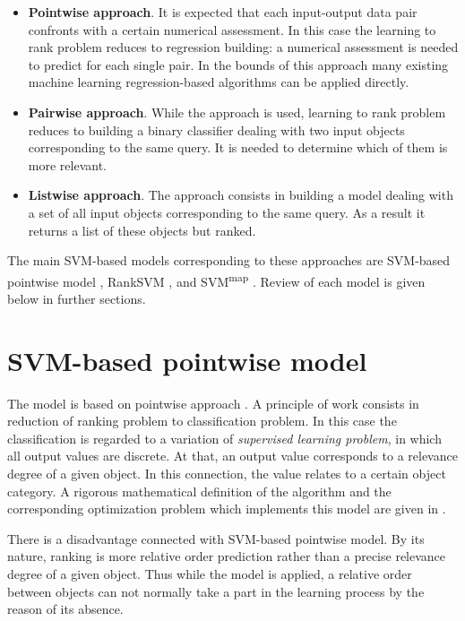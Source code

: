 \documentclass[12pt,a4paper,oneside]{article}
\begin{document}
\begin{itemize}
	\item \textbf{Pointwise approach}. It is expected that each input-output data pair confronts with a certain numerical assessment. 
	In this case the learning to rank problem reduces to regression building: a numerical assessment is needed to predict for each single pair. 
	In the bounds of this approach many existing machine learning regression-based algorithms can be applied directly.
	\item \textbf{Pairwise approach}. While the approach is used, learning to rank problem reduces to building a binary classifier dealing with two input objects corresponding to the same query. 
	It is needed to determine which of them is more relevant.
	\item \textbf{Listwise approach}. The approach consists in building a model dealing with a set of all input objects corresponding to the same query. 
	As a result it returns a list of these objects but ranked.
\end{itemize}

\par
The main SVM-based models corresponding to these approaches are SVM-based pointwise model , RankSVM , and SVM\textsuperscript{map} . 
Review of each model is given below in further sections. 


\section{SVM-based pointwise model}
\label{sec:svm_based_pointwise_model}

\par
The model is based on pointwise approach . 
A principle of work consists in reduction of ranking problem to classification problem. 
In this case the classification is regarded to a variation of \emph{supervised learning problem}, in which all output values are discrete. 
At that, an output value corresponds to a relevance degree of a given object. 
In this connection, the value relates to a certain object category. 
A rigorous mathematical definition of the algorithm and the corresponding optimization problem which implements this model are given in .

\par
There is a disadvantage connected with SVM-based pointwise model. 
By its nature, ranking is more relative order prediction rather than a precise relevance degree of a given object. 
Thus while the model is applied, a relative order between objects can not normally take a part in the learning process by the reason of its absence. 
\end{document}
